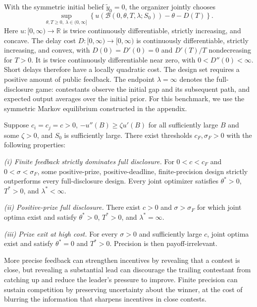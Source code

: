 \documentclass[mnsc]{informs3}
\begin{document}
With the symmetric initial belief $\tilde y_0=0$, the organizer jointly chooses
\begin{equation}\label{eq-designer-best-output-objective}
\sup_{\theta,T\geq0,\ \lambda\in(0,\infty]}
\left\{u\!\left(\mathcal B(0,\theta,T,\lambda;S_0)\right)
-\theta-D(T)\right\}.
\end{equation}
Here $u:[0,\infty)\to\mathbb R$ is twice continuously differentiable, strictly increasing, and concave. The delay cost $D:[0,\infty)\to[0,\infty)$ is continuously differentiable, strictly increasing, and convex, with $D(0)=D'(0)=0$ and $D'(T)/T$ nondecreasing for $T>0$. It is twice continuously differentiable near zero, with $0<D''(0)<\infty$. Short delays therefore have a locally quadratic cost.
The design set requires a positive amount of public feedback. The endpoint $\lambda=\infty$ denotes the full-disclosure game: contestants observe the initial gap and its subsequent path, and expected output averages over the initial prior. For this benchmark, we use the symmetric Markov equilibrium constructed in the appendix.

\begin{proposition}\label{prop-joint-design}
{Suppose $c_i=c_j=c>0$, $-u''(B)\geq\zeta u'(B)$ for all sufficiently large $B$ and some $\zeta>0$, and $S_0$ is sufficiently large. There exist thresholds $c_F,\sigma_F>0$ with the following properties:}

{\emph{(i) Finite feedback strictly dominates full disclosure.}
For $0<c<c_F$ and $0<\sigma<\sigma_F$, some positive-prize,
positive-deadline, finite-precision design strictly outperforms every
full-disclosure design. Every joint optimizer satisfies $\theta^*>0$,
$T^*>0$, and $\lambda^*<\infty$.}

\emph{(ii) Positive-prize full disclosure.}
There exist $c>0$ and $\sigma>\sigma_F$ for which joint optima exist and satisfy $\theta^*>0$, $T^*>0$, and $\lambda^*=\infty$.

\emph{(iii) Prize exit at high cost.}
For every $\sigma>0$ and sufficiently large $c$, joint optima exist and satisfy $\theta^*=0$ and $T^*>0$. Precision is then payoff-irrelevant.
\end{proposition}

More precise feedback can strengthen incentives by revealing that a contest is close, but revealing a substantial lead can discourage the trailing contestant from catching up and reduce the leader's pressure to improve. Finite precision can sustain competition by preserving uncertainty about the winner, at the cost of blurring the information that sharpens incentives in close contests.
\end{document}
